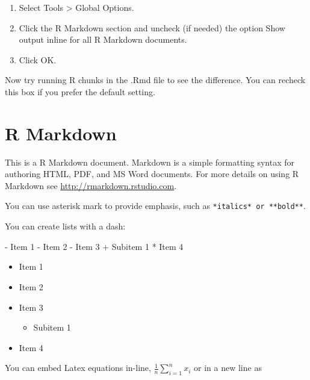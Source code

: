 \documentclass[
]{book}
\newenvironment{Shaded}{\begin{snugshade}}{\end{snugshade}}
\newcommand{\DecValTok}[1]{\textcolor[rgb]{0.00,0.00,0.81}{#1}}
\newcommand{\NormalTok}[1]{#1}
\newcommand{\SpecialCharTok}[1]{\textcolor[rgb]{0.00,0.00,0.00}{#1}}
\providecommand{\tightlist}{%
  \setlength{\itemsep}{0pt}\setlength{\parskip}{0pt}}
\begin{document}
\begin{enumerate}
\def\labelenumi{\arabic{enumi}.}
\tightlist
\item
  Select Tools \textgreater{} Global Options.
\item
  Click the R Markdown section and uncheck (if needed) the option Show output inline for all
  R Markdown documents.
\item
  Click OK.
\end{enumerate}

Now try running R chunks in the .Rmd file to see the difference. You can recheck this box if you prefer
the default setting.

\hypertarget{r-markdown}{%
\chapter{R Markdown}\label{r-markdown}}

This is a R Markdown document. Markdown is a simple formatting syntax for authoring HTML, PDF, and MS Word documents. For more details on using R Markdown see \url{http://rmarkdown.rstudio.com}.

You can use asterisk mark to provide emphasis, such as \texttt{*italics*\ or\ **bold**}.

You can create lists with a dash:

\begin{Shaded}
\begin{Highlighting}[]
\SpecialCharTok{{-}}\NormalTok{ Item }\DecValTok{1}
\SpecialCharTok{{-}}\NormalTok{ Item }\DecValTok{2}
\SpecialCharTok{{-}}\NormalTok{ Item }\DecValTok{3}
  \SpecialCharTok{+}\NormalTok{ Subitem }\DecValTok{1}
\SpecialCharTok{*}\NormalTok{ Item }\DecValTok{4}
\end{Highlighting}
\end{Shaded}

\begin{itemize}
\tightlist
\item
  Item 1
\item
  Item 2
\item
  Item 3

  \begin{itemize}
  \tightlist
  \item
    Subitem 1
  \end{itemize}
\item
  Item 4
\end{itemize}

You can embed Latex equations in-line, \(\frac{1}{n} \sum_{i=1}^{n} x_{i}\) or in a new line as
\end{document}
